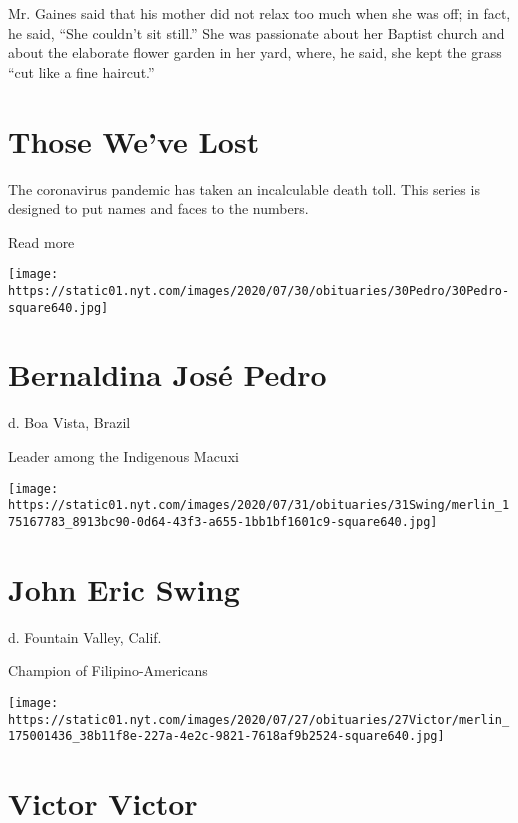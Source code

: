 Mr. Gaines said that his mother did not relax too much when she was off;
in fact, he said, ``She couldn't sit still.'' She was passionate about
her Baptist church and about the elaborate flower garden in her yard,
where, he said, she kept the grass ``cut like a fine haircut.''

\href{https://www.nytimes.com/interactive/2020/obituaries/people-died-coronavirus-obituaries.html?action=click\&pgtype=Article\&state=default\&region=BELOW_MAIN_CONTENT\&context=covid_obits_promo}{}

\hypertarget{those-weve-lost}{%
\section{Those We've Lost}\label{those-weve-lost}}

The coronavirus pandemic has taken an incalculable death toll. This
series is designed to put names and faces to the numbers.

Read more

\texttt{[image: https://static01.nyt.com/images/2020/07/30/obituaries/30Pedro/30Pedro-square640.jpg]}

\hypertarget{bernaldina-josuxe9-pedro}{%
\section{Bernaldina José Pedro}\label{bernaldina-josuxe9-pedro}}

d. Boa Vista, Brazil

Leader among the Indigenous Macuxi

\texttt{[image: https://static01.nyt.com/images/2020/07/31/obituaries/31Swing/merlin\_175167783\_8913bc90-0d64-43f3-a655-1bb1bf1601c9-square640.jpg]}

\hypertarget{john-eric-swing}{%
\section{John Eric Swing}\label{john-eric-swing}}

d. Fountain Valley, Calif.

Champion of Filipino-Americans

\texttt{[image: https://static01.nyt.com/images/2020/07/27/obituaries/27Victor/merlin\_175001436\_38b11f8e-227a-4e2c-9821-7618af9b2524-square640.jpg]}

\hypertarget{victor-victor}{%
\section{Victor Victor}\label{victor-victor}}

